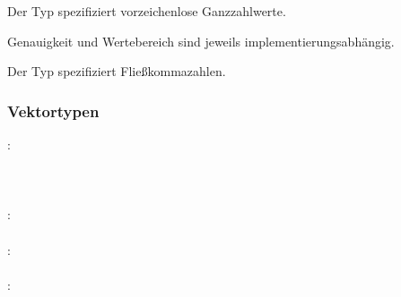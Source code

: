 Der Typ  spezifiziert vorzeichenlose Ganzzahlwerte.

Genauigkeit und Wertebereich sind jeweils implementierungsabhängig.

Der Typ  spezifiziert Fließkommazahlen.







\subsubsection{Vektortypen}\label{Vektortypen}
:\label{typ_vektor}\\
\hspace*{1cm} \\
\hspace*{1cm} \\
\hspace*{1cm} \\
:\label{typ_vektor_int}\\
\hspace*{1cm}\Gspace{}\\
:\label{typ_vektor_float}\\
\hspace*{1cm}\\
:\label{typ_vektor_bool}\\
\hspace*{1cm}\\


